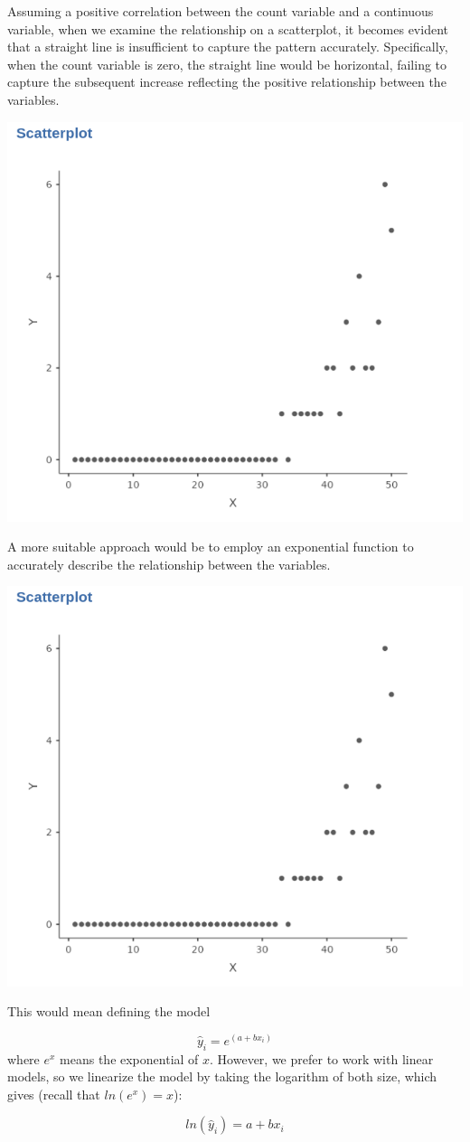 \documentclass[
]{book}
\begin{document}
Assuming a positive correlation between the count variable and a continuous variable, when we examine the relationship on a scatterplot, it becomes evident that a straight line is insufficient to capture the pattern accurately. Specifically, when the count variable is zero, the straight line would be horizontal, failing to capture the subsequent increase reflecting the positive relationship between the variables.

\includegraphics[width=0.6\linewidth]{bookletpics/3_poisson_theory5}

A more suitable approach would be to employ an exponential function to accurately describe the relationship between the variables.

\includegraphics[width=0.6\linewidth]{bookletpics/3_poisson_theory5}

This would mean defining the model

\[
\hat{y}_i=e^{(a+bx_i)}
\]
where \(e^x\) means the exponential of \(x\). However, we prefer to work with linear models, so we linearize the model by taking the logarithm of both size, which gives (recall that \(ln(e^x)=x\)):

\[
ln(\hat{y}_i)=a+bx_i
\]
\end{document}
